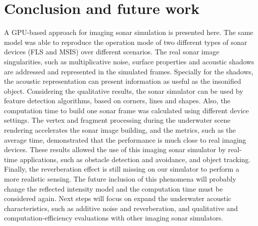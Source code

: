 \documentclass[final,5p,times]{elsarticle}
\begin{document}

\section{Conclusion and future work}
\label{conclusion}

A GPU-based approach for imaging sonar simulation is presented here.
The same model was able to reproduce the operation mode of two different
types of sonar devices (FLS and MSIS) over different scenarios. The real
sonar image singularities, such as multiplicative noise, surface
properties and acoustic shadows are addressed and represented in the
simulated frames. Specially for the shadows, the acoustic representation
can present information as useful as the insonified object. Considering
the qualitative results, the sonar simulator can be used by feature detection
algorithms, based on corners, lines and shapes. Also, the computation time
to build one sonar frame was calculated using different device settings.
The vertex and fragment processing during the underwater scene rendering
accelerates the sonar image building, and the metrics, such as the average
time, demonstrated that the performance is much close to real imaging
devices. These results allowed the use of this imaging sonar simulator
by real-time applications, such as obstacle detection and avoidance, and
object tracking. Finally, the reverberation effect is still missing on
our simulator to perform a more realistic sensing. The future inclusion
of this phenomena will probably change the reflected intensity model
and the computation time must be considered again. Next steps will
focus on expand the underwater acoustic characteristics, such as additive
noise and reverberation, and qualitative and computation\hyp{}efficiency
evaluations with other imaging sonar simulators.









\end{document}
